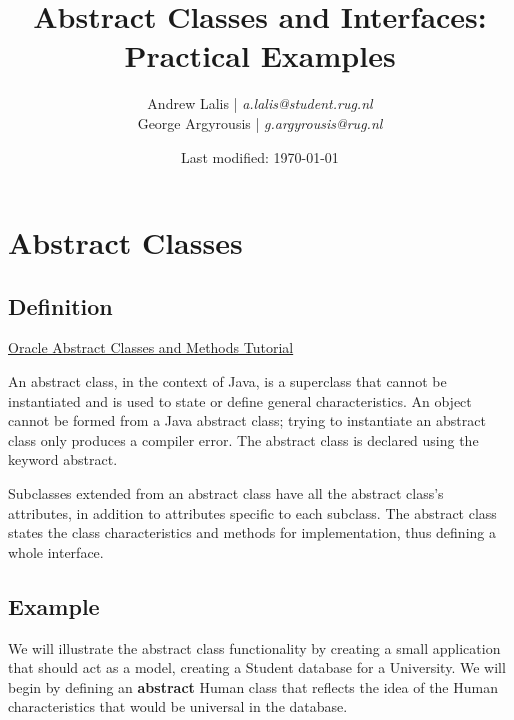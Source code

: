 \documentclass{article}
\begin{document}
    \title{Abstract Classes and Interfaces: Practical Examples}
    \author{Andrew Lalis | \emph{a.lalis@student.rug.nl} \\
            George Argyrousis | \emph{g.argyrousis@rug.nl} }
    \date{Last modified: \today}

    \maketitle

    \section{Abstract Classes}
        \subsection{Definition}
        	\href{https://docs.oracle.com/javase/tutorial/java/IandI/abstract.html}{Oracle Abstract Classes and Methods Tutorial}

            An abstract class, in the context of Java, is a superclass that cannot be instantiated and is used to state or define general characteristics. An object cannot be formed from a Java abstract class; trying to instantiate an abstract class only produces a compiler error. The abstract class is declared using the keyword abstract.

            Subclasses extended from an abstract class have all the abstract class's attributes, in addition to attributes specific to each subclass. The abstract class states the class characteristics and methods for implementation, thus defining a whole interface.

        \subsection{Example}
            We will illustrate the abstract class functionality by creating a small application that should act as a model, creating a Student database for a University. We will begin by defining an \textbf{abstract} Human class that reflects the idea of the Human characteristics that would be universal in the database.
\end{document}
